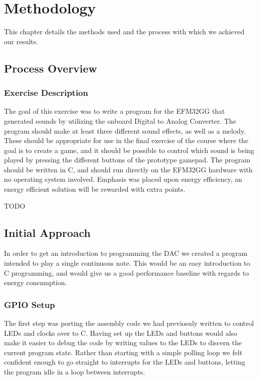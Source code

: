 \chapter{Methodology}
This chapter details the methods used and the process with which we achieved our results.

\section{Process Overview} %

\subsection{Exercise Description}
The goal of this exercise was to write a program for the EFM32GG that generated sounds by utilizing the onboard Digital to Analog Converter. The program should make at least three different sound effects, as well as a melody. These should be appropriate for use in the final exercise of the course where the goal is to create a game, and it should be possible to control which sound is being played by pressing the different buttons of the prototype gamepad. The program should be written in C, and should run directly on the EFM32GG hardware with no operating system involved. Emphasis was placed upon energy efficiency, an energy efficient solution will be rewarded with extra points.

TODO %


\section{Initial Approach}
In order to get an introduction to programming the DAC we created a program intended to play a single continuous note. This would be an easy introduction to C programming, and would give us a good performance baseline with regards to energy consumption.

\subsection{GPIO Setup} 
The first step was porting the assembly code we had previosuly written to control LEDs and clocks over to C. Having set up the LEDs and buttons would also make it easier to debug the code by writing values to the LEDs to discern the current program state. Rather than starting with a simple polling loop we felt confident enough to go straight to interrupts for the LEDs and buttons, letting the program idle in a loop between interrupts.

